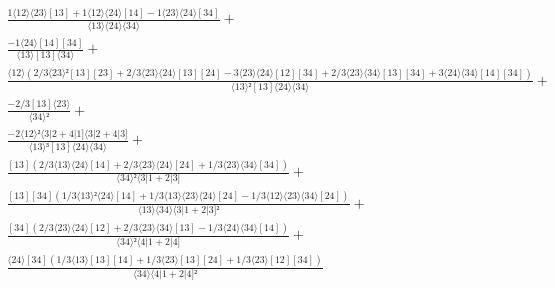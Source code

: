 \documentclass[varwidth, border=5pt]{standalone}
\begin{document}
\begin{my}
$\begin{gathered}
\scriptscriptstyle\frac{1⟨12⟩⟨23⟩[13]+1⟨12⟩⟨24⟩[14]-1⟨23⟩⟨24⟩[34]}{⟨13⟩⟨24⟩⟨34⟩} +\\
\scriptscriptstyle\frac{-1⟨24⟩[14][34]}{⟨13⟩[13]⟨34⟩} +\\
\scriptscriptstyle\frac{⟨12⟩(2/3⟨23⟩²[13][23]+2/3⟨23⟩⟨24⟩[13][24]-3⟨23⟩⟨24⟩[12][34]+2/3⟨23⟩⟨34⟩[13][34]+3⟨24⟩⟨34⟩[14][34])}{⟨13⟩²[13]⟨24⟩⟨34⟩} +\\
\scriptscriptstyle\frac{-2/3[13]⟨23⟩}{⟨34⟩²} +\\
\scriptscriptstyle\frac{-2⟨12⟩²⟨3|2+4|1]⟨3|2+4|3]}{⟨13⟩³[13]⟨24⟩⟨34⟩} +\\
\scriptscriptstyle\frac{[13](2/3⟨13⟩⟨24⟩[14]+2/3⟨23⟩⟨24⟩[24]+1/3⟨23⟩⟨34⟩[34])}{⟨34⟩²⟨3|1+2|3]} +\\
\scriptscriptstyle\frac{[13][34](1/3⟨13⟩²⟨24⟩[14]+1/3⟨13⟩⟨23⟩⟨24⟩[24]-1/3⟨12⟩⟨23⟩⟨34⟩[24])}{⟨13⟩⟨34⟩⟨3|1+2|3]²} +\\
\scriptscriptstyle\frac{[34](2/3⟨23⟩⟨24⟩[12]+2/3⟨23⟩⟨34⟩[13]-1/3⟨24⟩⟨34⟩[14])}{⟨34⟩²⟨4|1+2|4]} +\\
\scriptscriptstyle\frac{⟨24⟩[34](1/3⟨13⟩[13][14]+1/3⟨23⟩[13][24]+1/3⟨23⟩[12][34])}{⟨34⟩⟨4|1+2|4]²} \phantom{+}
\end{gathered}$
\end{my}
\end{document}
